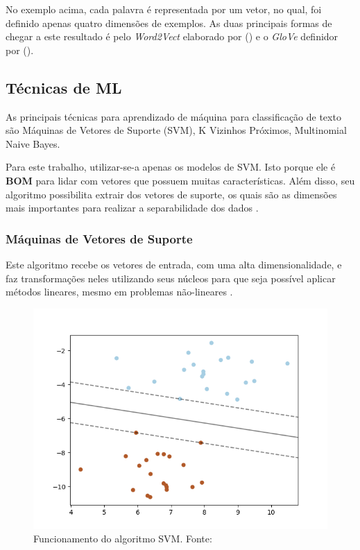 No exemplo acima, cada palavra é representada por um vetor, no qual, foi definido apenas quatro dimensões de exemplos. As duas principais formas de chegar a este resultado é pelo \textit{Word2Vect} elaborado por \citeauthor{MIKOLOV2013a} (\citeyear{MIKOLOV2013a}) e o \textit{GloVe} definidor por \citeauthor{PENNINGTON2014} (\citeyear{PENNINGTON2014}).

\subsection{Técnicas de ML}

As principais técnicas para aprendizado de máquina para classificação de texto são Máquinas de Vetores de Suporte (SVM), K Vizinhos Próximos, Multinomial Naive Bayes.

Para este trabalho, utilizar-se-a apenas os modelos de SVM. Isto porque ele é \textbf{BOM} para lidar com vetores que possuem muitas características. Além disso, seu algoritmo possibilita extrair dos vetores de suporte, os quais são as dimensões mais importantes para realizar a separabilidade dos dados \cite{HEARST1995}.

\subsubsection{Máquinas de Vetores de Suporte}

Este algoritmo recebe os vetores de entrada, com uma alta dimensionalidade, e faz transformações neles utilizando seus núcleos para que seja possível aplicar métodos lineares, mesmo em problemas não-lineares \cite{HEARST1995}.

\begin{figure}[h]
	\centering
    \includegraphics[keepaspectratio=true,scale=0.4]{figuras/svmExample}
	\caption[SVM Funcionamento]{Funcionamento do algoritmo SVM. Fonte: \cite[Acesso em 10 de Junho de 2018.]{PEDREGOSA2011}}
	\label{fig:svmExample}
\end{figure}

